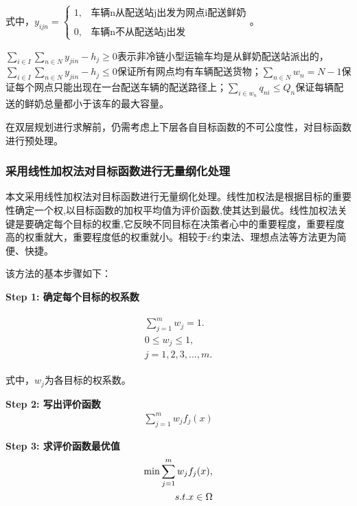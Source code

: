 \documentclass[withoutpreface,bwprint]{cumcmthesis} %
\begin{document}
式中，${y_{ijn}} = \left\{ {\begin{array}{*{20}{c}}
			{1,}&{\text{车辆n从配送站j出发为网点i配送鲜奶}}\\
			{}&{}\\
			{0,}&{\text{车辆n不从配送站j出发}}
	\end{array}} \right.$。
	

$\sum\limits_{i \in I}^{} {\sum\limits_{n \in N}^{} {{y_{jin}}} }  - {h_j} \ge 0$表示非冷链小型运输车均是从鲜奶配送站派出的，$\sum\limits_{i \in I}^{} {\sum\limits_{n \in N}^{} {{y_{jin}}} }  - {h_j} \le 0$保证所有网点均有车辆配送货物；$\sum\limits_{n \in N}^{} {{w_n}}  = N - 1$保证每个网点只能出现在一台配送车辆的配送路径上；$\sum\limits_{i \in {w_n}}^{} {{q_{ni}}}  \le {Q_n}$保证每辆配送的鲜奶总量都小于该车的最大容量。
	 
在双层规划进行求解前，仍需考虑上下层各自目标函数的不可公度性，对目标函数进行预处理。
	 
\subsubsection{采用线性加权法对目标函数进行无量纲化处理}
本文采用线性加权法对目标函数进行无量纲化处理。线性加权法是根据目标的重要性确定一个权,以目标函数的加权平均值为评价函数,使其达到最优。线性加权法关键是要确定每个目标的权重,它反映不同目标在决策者心中的重要程度，重要程度高的权重就大，重要程度低的权重就小。相较于$\varepsilon$约束法、理想点法等方法更为简便、快捷。

该方法的基本步骤如下：
	
	\textbf{Step 1: 确定每个目标的权系数}
	
	\begin{align*}
		\begin{array}{l}
			\sum\limits_{j = 1}^m {{w_j}}  = 1.\\
			0 \le {w_j} \le 1,\\
			j = 1,2,3,...,m.
		\end{array}
	\end{align*}
	
	式中，$w_j$为各目标的权系数。
	
	\textbf{Step 2: 写出评价函数}
	\begin{align*}
		\sum\limits_{j = 1}^m {{w_j}{f_j}} (x)
	\end{align*}
	
	\textbf{Step 3: 求评价函数最优值}
	\begin{align*}
		{\rm{min }}\sum\limits_{j = 1}^m {{w_j}{f_j}} (x),\\
		s.t.x \in \Omega 
	\end{align*}
	
\end{document}
